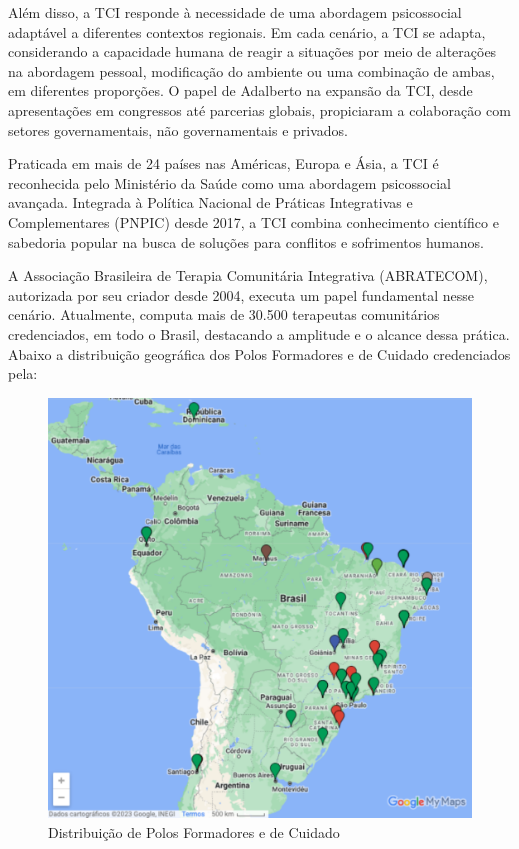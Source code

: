 Além disso, a TCI responde à necessidade de uma abordagem psicossocial adaptável a diferentes contextos regionais. Em cada cenário, a TCI se adapta, considerando a capacidade humana de reagir a situações por meio de alterações na abordagem pessoal, modificação do ambiente ou uma combinação de ambas, em diferentes proporções.\cite{DANTAS} O papel de Adalberto na expansão da TCI, desde apresentações em congressos até parcerias globais, propiciaram a colaboração com setores governamentais, não governamentais e privados.\cite{GOMES}

Praticada em mais de 24 países nas Américas, Europa e Ásia, a TCI é reconhecida pelo Ministério da Saúde como uma abordagem psicossocial avançada. Integrada à Política Nacional de Práticas Integrativas e Complementares (PNPIC) desde 2017, a TCI combina conhecimento científico e sabedoria popular na busca de soluções para conflitos e sofrimentos humanos.\cite{ABRATECOM}

A Associação Brasileira de Terapia Comunitária Integrativa (ABRATECOM), autorizada por seu criador desde 2004, executa um papel fundamental nesse cenário. Atualmente, computa mais de 30.500 terapeutas comunitários credenciados, em todo o Brasil, destacando a amplitude e o alcance dessa prática.\cite{SILVAFRANCO} Abaixo a distribuição geográfica dos Polos Formadores e de Cuidado credenciados pela\cite{ABRATECOM}:

\begin{figure}[!h] %
    \centering
    \includegraphics[scale=0.7]{latex/figuras/polos.pdf}
    \caption[Terapia Comunitária Integrativa]%
    {Distribuição de Polos Formadores e de Cuidado}%
\end{figure}

